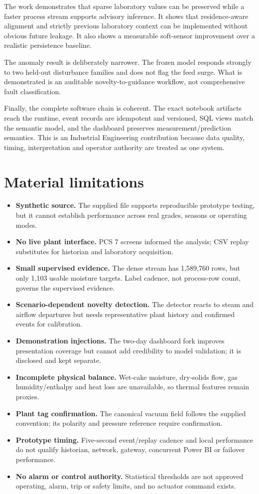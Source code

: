 The work demonstrates that sparse laboratory values can be preserved while a faster process stream supports advisory inference. It shows that residence-aware alignment and strictly previous laboratory context can be implemented without obvious future leakage. It also shows a measurable soft-sensor improvement over a realistic persistence baseline.

The anomaly result is deliberately narrower. The frozen model responds strongly to two held-out disturbance families and does not flag the feed surge. What is demonstrated is an auditable novelty-to-guidance workflow, not comprehensive fault classification.

Finally, the complete software chain is coherent. The exact notebook artifacts reach the runtime, event records are idempotent and versioned, SQL views match the semantic model, and the dashboard preserves measurement/prediction semantics. This is an Industrial Engineering contribution because data quality, timing, interpretation and operator authority are treated as one system.

\section{Material limitations}

\begin{itemize}
\item \textbf{Synthetic source.} The supplied file supports reproducible prototype testing, but it cannot establish performance across real grades, seasons or operating modes.
\item \textbf{No live plant interface.} PCS 7 screens informed the analysis; CSV replay substitutes for historian and laboratory acquisition.
\item \textbf{Small supervised evidence.} The dense stream has 1,589,760 rows, but only 1,103 usable moisture targets. Label cadence, not process-row count, governs the supervised evidence.
\item \textbf{Scenario-dependent novelty detection.} The detector reacts to steam and airflow departures but needs representative plant history and confirmed events for calibration.
\item \textbf{Demonstration injections.} The two-day dashboard fork improves presentation coverage but cannot add credibility to model validation; it is disclosed and kept separate.
\item \textbf{Incomplete physical balance.} Wet-cake moisture, dry-solids flow, gas humidity/enthalpy and heat loss are unavailable, so thermal features remain proxies.
\item \textbf{Plant tag confirmation.} The canonical vacuum field follows the supplied convention; its polarity and pressure reference require confirmation.
\item \textbf{Prototype timing.} Five-second event/replay cadence and local performance do not qualify historian, network, gateway, concurrent Power BI or failover performance.
\item \textbf{No alarm or control authority.} Statistical thresholds are not approved operating, alarm, trip or safety limits, and no actuator command exists.
\end{itemize}


